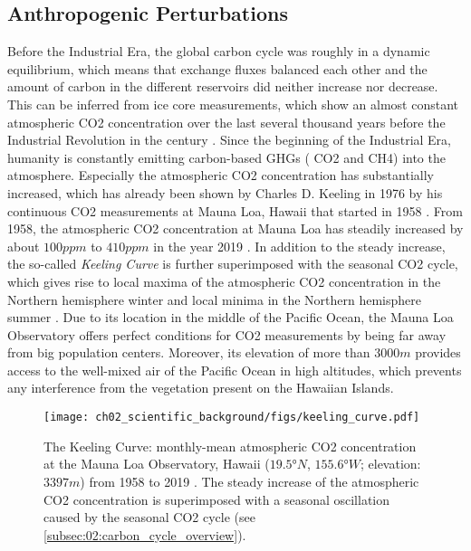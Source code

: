 \subsection{Anthropogenic Perturbations}
\label{subsec:02:carbon_cycle_perturbations}

Before the Industrial Era, the global carbon cycle was roughly in a dynamic
equilibrium, which means that exchange fluxes balanced each other and the
amount of carbon in the different reservoirs did neither increase nor decrease.
This can be inferred from ice core measurements, which show an almost constant
atmospheric \ac{CO2} concentration over the last several thousand years before
the Industrial Revolution in the  century \autocite{Ciais2013}. Since
the beginning of the Industrial Era, humanity is constantly emitting
carbon-based \acp{GHG} (\eg{} \ac{CO2} and \ac{CH4}) into the atmosphere.
Especially the atmospheric \ac{CO2} concentration has substantially increased,
which has already been shown by Charles D. Keeling in 1976 by his continuous
\ac{CO2} measurements at Mauna Loa, Hawaii that started in 1958
. From 1958, the
atmospheric \ac{CO2} concentration at Mauna Loa has steadily increased by about
$100 \unit{ppm}$ to $410 \unit{ppm}$ in the year 2019 \autocite{Keeling2005}.
In addition to the steady increase, the so-called \emph{Keeling Curve} is
further superimposed with the seasonal \ac{CO2} cycle, which gives rise to
local maxima of the atmospheric \ac{CO2} concentration in the Northern
hemisphere winter and local minima in the Northern hemisphere summer
. Due to
its location in the middle of the Pacific Ocean, the Mauna Loa Observatory
offers perfect conditions for \ac{CO2} measurements by being far away from big
population centers. Moreover, its elevation of more than $3000 \unit{m}$
provides access to the well-mixed air of the Pacific Ocean in high altitudes,
which prevents any interference from the vegetation present on the Hawaiian
Islands.

\begin{figure}[t]
  \centering
  \texttt{[image: 
    ch02\_scientific\_background/figs/keeling\_curve.pdf]}
  \caption{The Keeling Curve: monthly-mean atmospheric \acs{CO2} concentration
    at the Mauna Loa Observatory, Hawaii ($19.5 \unit{\degree N}$, $155.6
    \unit{\degree W}$; elevation: $3397 \unit{m}$) from 1958 to 2019
    \autocite{Keeling2005}. The steady increase of the atmospheric \acs{CO2}
    concentration is superimposed with a seasonal oscillation caused by the
    seasonal \acs{CO2} cycle (see \cref{subsec:02:carbon_cycle_overview}).}
  \label{fig:02:keeling_curve}
\end{figure}

